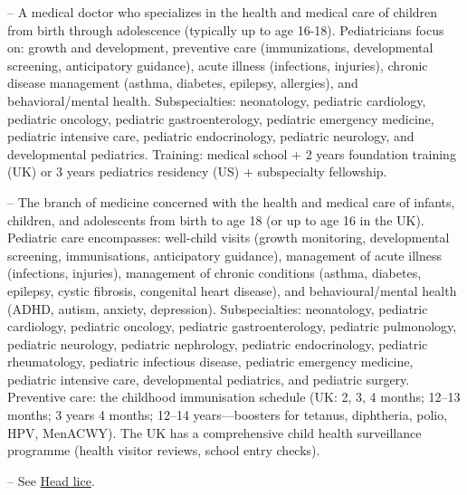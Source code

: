 -- A medical doctor who specializes in the health and medical care of children from birth through adolescence (typically up to age 16-18). Pediatricians focus on: growth and development, preventive care (immunizations, developmental screening, anticipatory guidance), acute illness (infections, injuries), chronic disease management (asthma, diabetes, epilepsy, allergies), and behavioral/mental health. Subspecialties: neonatology, pediatric cardiology, pediatric oncology, pediatric gastroenterology, pediatric emergency medicine, pediatric intensive care, pediatric endocrinology, pediatric neurology, and developmental pediatrics. Training: medical school + 2 years foundation training (UK) or 3 years pediatrics residency (US) + subspecialty fellowship.

-- The branch of medicine concerned with the health and medical care of infants, children, and adolescents from birth to age 18 (or up to age 16 in the UK). Pediatric care encompasses: well-child visits (growth monitoring, developmental screening, immunisations, anticipatory guidance), management of acute illness (infections, injuries), management of chronic conditions (asthma, diabetes, epilepsy, cystic fibrosis, congenital heart disease), and behavioural/mental health (ADHD, autism, anxiety, depression). Subspecialties: neonatology, pediatric cardiology, pediatric oncology, pediatric gastroenterology, pediatric pulmonology, pediatric neurology, pediatric nephrology, pediatric endocrinology, pediatric rheumatology, pediatric infectious disease, pediatric emergency medicine, pediatric intensive care, developmental pediatrics, and pediatric surgery. Preventive care: the childhood immunisation schedule (UK: 2, 3, 4 months; 12--13 months; 3 years 4 months; 12--14 years—boosters for tetanus, diphtheria, polio, HPV, MenACWY). The UK has a comprehensive child health surveillance programme (health visitor reviews, school entry checks).

-- See \hyperlink{Head lice}{Head lice}.

